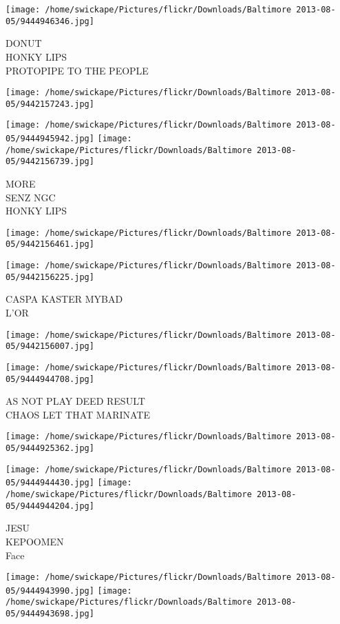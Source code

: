 \documentclass[10pt,letterpaper]{article}
\begin{document}
\texttt{[image: /home/swickape/Pictures/flickr/Downloads/Baltimore 2013-08-05/9444946346.jpg]}

DONUT\\
HONKY LIPS\\
PROTOPIPE TO THE PEOPLE
\pagebreak

\texttt{[image: /home/swickape/Pictures/flickr/Downloads/Baltimore 2013-08-05/9442157243.jpg]}

\vspace{0.25in}
\texttt{[image: /home/swickape/Pictures/flickr/Downloads/Baltimore 2013-08-05/9444945942.jpg]}
\texttt{[image: /home/swickape/Pictures/flickr/Downloads/Baltimore 2013-08-05/9442156739.jpg]}

MORE\\
SENZ NGC\\
HONKY LIPS
\pagebreak

\texttt{[image: /home/swickape/Pictures/flickr/Downloads/Baltimore 2013-08-05/9442156461.jpg]}

\vspace{0.25in}
\texttt{[image: /home/swickape/Pictures/flickr/Downloads/Baltimore 2013-08-05/9442156225.jpg]}

CASPA KASTER MYBAD\\
L'OR
\pagebreak

\texttt{[image: /home/swickape/Pictures/flickr/Downloads/Baltimore 2013-08-05/9442156007.jpg]}

\vspace{0.25in}
\texttt{[image: /home/swickape/Pictures/flickr/Downloads/Baltimore 2013-08-05/9444944708.jpg]}

AS NOT PLAY DEED RESULT\\
CHAOS LET THAT MARINATE
\pagebreak

\texttt{[image: /home/swickape/Pictures/flickr/Downloads/Baltimore 2013-08-05/9444925362.jpg]}

\vspace{0.25in}
\texttt{[image: /home/swickape/Pictures/flickr/Downloads/Baltimore 2013-08-05/9444944430.jpg]}
\texttt{[image: /home/swickape/Pictures/flickr/Downloads/Baltimore 2013-08-05/9444944204.jpg]}

JESU\\
KEPOOMEN\\
Face
\pagebreak

\texttt{[image: /home/swickape/Pictures/flickr/Downloads/Baltimore 2013-08-05/9444943990.jpg]}
\texttt{[image: /home/swickape/Pictures/flickr/Downloads/Baltimore 2013-08-05/9444943698.jpg]}
\end{document}
